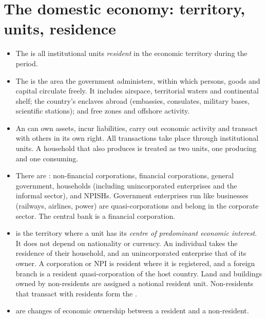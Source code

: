 \section{The domestic economy: territory, units, residence}\label{sec:res}

\begin{itemize}
\item The  is all institutional units \emph{resident} in the economic territory during
  the period.
\item The  is the area the government administers, within which persons,
  goods and capital circulate freely. It includes airspace, territorial waters and continental
  shelf; the country's enclaves abroad (embassies, consulates, military bases, scientific
  stations); and free zones and offshore activity.
\item An  can own assets, incur liabilities, carry out economic activity
  and transact with others in its own right. All transactions take place through institutional
  units. A household that also produces is treated as two units, one producing and one consuming.
\item There are : non-financial corporations, financial corporations, general
  government, households (including unincorporated enterprises and the informal sector), and
  NPISHs. Government enterprises run like businesses (railways, airlines, power) are
  quasi-corporations and belong in the corporate sector. The central bank is a financial
  corporation.
\item {} is the territory where a unit has its \emph{centre of predominant economic
  interest}. It does not depend on nationality or currency. An individual takes the residence of
  their household, and an unincorporated enterprise that of its owner. A corporation or NPI is
  resident where it is registered, and a foreign branch is a resident quasi-corporation of the
  host country. Land and buildings owned by non-residents are assigned a notional resident unit.
  Non-residents that transact with residents form the .
\item {} are changes of economic ownership between a resident and a
  non-resident.
\end{itemize}

